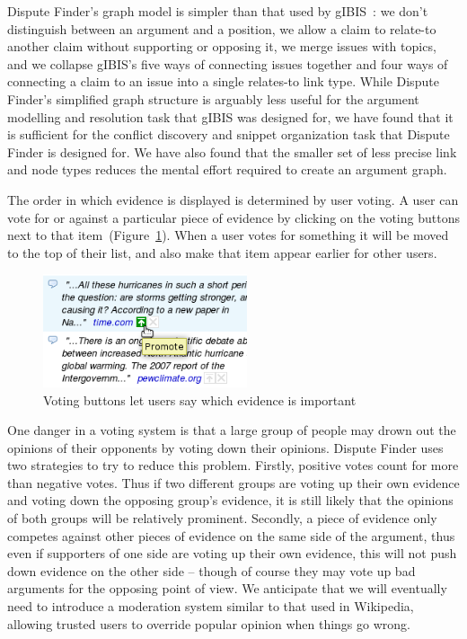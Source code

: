 \documentclass{www2010-submission}
\newcommand{\todo}[1]{}
\begin{document}
Dispute Finder's graph model is simpler than that used by gIBIS~\cite{Conklin1987a}: we don't distinguish between an argument and a position, we allow a claim to relate-to another claim without supporting or opposing it, we merge issues with topics, and we collapse gIBIS's five ways of connecting issues together and four ways of connecting a claim to an issue into a single relates-to link type. 
While Dispute Finder's simplified graph structure is arguably less useful for the argument modelling and resolution task that gIBIS was designed for, we have found that it is sufficient for the conflict discovery and snippet organization task that Dispute Finder is designed for. 
We have also found that the smaller set of less precise link and node types reduces the mental effort required to create an argument graph.

The order in which evidence is displayed is determined by user voting. A user can vote for or against a particular piece of evidence by clicking on the voting buttons next to that item~(Figure~\ref{voting}). When a user votes for something it will be moved to the top of their list, and also make that item appear earlier for other users.

\begin{figure}[tb]
	\begin{center}
	\includegraphics[width=6cm]{../screenshots/v2_vote.png}
	\caption{Voting buttons let users say which evidence is important}
	\label{voting}
	\end{center}
\end{figure}


One danger in a voting system is that a large group of people may drown out the opinions of their opponents by voting down their opinions. Dispute Finder uses two strategies to try to reduce this problem. Firstly, positive votes count for more than negative votes. Thus if two different groups are voting up their own evidence and voting down the opposing group's evidence, it is still likely that the opinions of both groups will be relatively prominent. Secondly, a piece of evidence only competes against other pieces of evidence on the same side of the argument, thus even if supporters of one side are voting up their own evidence, this will not push down evidence on the other side -- though of course they may vote up bad arguments for the opposing point of view. We anticipate that we will eventually need to introduce a moderation system similar to that used in Wikipedia, allowing trusted users to override popular opinion when things go wrong. 
\todo{Talk about whether we know if this works}
\end{document}
